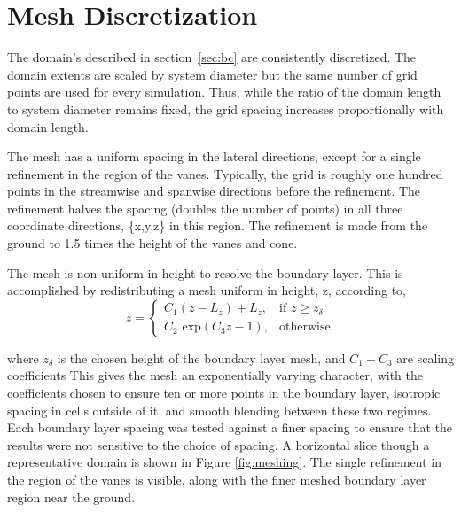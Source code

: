 %
%


\section{Mesh Discretization}

%
%
The domain's described in section~\ref{sec:bc} are
consistently discretized. The domain extents
are scaled by system diameter but the same number of grid points are used
for every simulation. Thus, while the ratio of the domain length to system
diameter remains fixed, the grid spacing increases proportionally with
domain length. 

The mesh has a uniform spacing in the lateral directions, except for a
single refinement in the region of the vanes. Typically, the grid is 
roughly one hundred points in the streamwise and spanwise directions
before the refinement. The refinement halves the spacing (doubles the
number of points) in all three
coordinate directions, \{x,y,z\} in this region. The refinement is made
from the ground to 1.5 times the height of the vanes and cone. 

The mesh is non-uniform in height to
resolve the boundary layer. This is accomplished by redistributing a
mesh uniform in height, z, according to,
\begin{equation}
 z = \begin{cases} C_1(z-L_z)+L_z,& \text{if } z \geq z_\delta\\
      C_2 \text{ exp}(C_3 z - 1),                 & \text{otherwise}
     \end{cases}
\end{equation}

where $z_\delta$ is the chosen height of the boundary layer mesh, and
$C_1-C_3$ are scaling coefficients%
This gives the mesh an exponentially
varying character, with the coefficients chosen to ensure ten or more
points in the boundary layer, isotropic spacing in cells outside of
it, and smooth blending between these two regimes. Each boundary layer
spacing was tested against a finer spacing to ensure that the results
were not sensitive to the choice of spacing. A horizontal slice though a
representative domain is shown in Figure \ref{fig:meshing}. The single
refinement in the region of the vanes is visible, along with the finer
meshed boundary layer region near the ground. 

